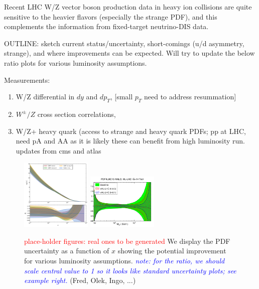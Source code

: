 \documentclass[../report.tex]{subfiles}
\begin{document}
Recent LHC W/Z  vector boson production
data in heavy ion  collisions are quite sensitive to the
heavier flavors (especially the strange PDF), and this complements the
information from fixed-target  neutrino-DIS data.\cite{Kusina:2016fxy}

OUTLINE: sketch current status/uncertainty, short-comings (u/d asymmetry, strange),
and where improvements can be expected. Will try to update the below 
ratio plots for various luminosity assumptions. 


Measurements: 
\begin{enumerate}
\item 
W/Z differential in $dy$ and $dp_T$, [small $p_T$ need to address resummation] 

\item 
$W^\pm/Z$ cross section correlations,

\item 
 W/Z+ heavy quark (access to strange and heavy quark PDFs; pp at LHC, need pA and AA 
as it is likely these can benefit from high luminosity run.
\\
updates from cms\cite{Chatrchyan:2013uja} and atlas\cite{Aad:2014xca}


\end{enumerate}



\begin{figure}[ht]
\centering{} 
\includegraphics[width=0.30\textwidth]{figs/sampleLum.png}
\hfil
\includegraphics[width=0.30\textwidth]{figs/pdfTMP2.png}
\caption{
\textcolor{red}{place-holder figures: real ones to be generated}
We display the PDF uncertainty as a function of $x$ 
showing the potential improvement for various luminosity assumptions.
\textcolor{blue}{\it note: for the ratio, we should scale  central value to 1 so 
it looks like standard uncertainty plots; see example right.}
(Fred, Olek, Ingo, ...)}
\end{figure}
\end{document}
